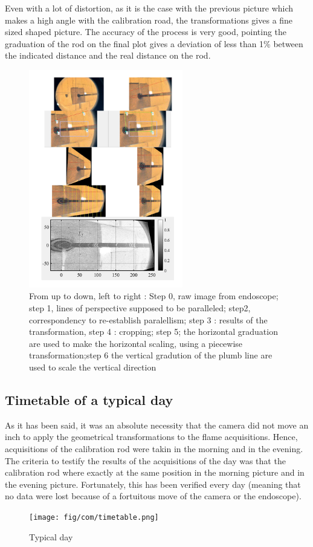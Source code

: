 Even with a lot of distortion, as it is the case with the previous picture which makes a high angle with the calibration road, the transformations gives a fine sized shaped picture. The accuracy of the process is very good, pointing the graduation of the rod on the final plot gives a deviation of less than 1\% between the indicated distance and the real distance on the rod.
\begin{figure}[!h]
  \centering
\includegraphics[width=0.6\textwidth]{fig/Matlab_calibration.pdf}
  \caption{From up to down, left to right : Step 0, raw image from endoscope; step 1, lines of perspective supposed to be paralleled; step2, correspondency to re-establish paralellism; step 3 : results of the transformation, step 4 : cropping; step 5; the horizontal graduation are used to make the horizontal scaling, using a piecewise transformation;step 6 the vertical gradution of the plumb line are used to scale the vertical direction }
 \label{fig_timetable}
\end{figure}

\subsection{Timetable of a typical day}

As it has been said, it was an absolute necessity that the camera did not move an inch to apply the geometrical transformations to the flame acquisitions. Hence, acquisitions of the calibration rod were takin in the morning and in the evening. The criteria to testify the results of the acquisitions of the day was that the calibration rod where exactly at the same position in the morning picture and in the evening picture. Fortunately, this has been verified every day (meaning that no data were lost because of a fortuitous move of the camera or the endoscope).
\begin{figure}[!h]
  \centering
\texttt{[image: fig/com/timetable.png]}
  \caption{Typical day}
 \label{fig_timetable}
\end{figure}

